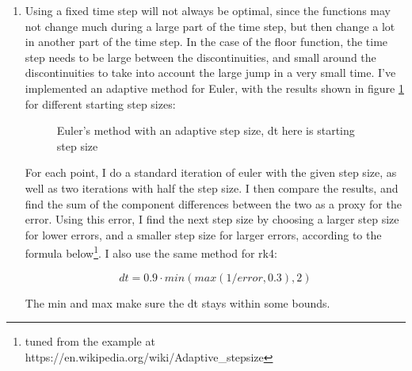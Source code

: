 \documentclass[12pt,a4paper]{article}
\begin{document}
\begin{enumerate}[label=(\alph*)]
	\item Using a fixed time step will not always be optimal, since the functions may not change much during a large part of the time step, but then change a lot in another part of the time step. In the case of the floor function, the time step needs to be large between the discontinuities, and small around the discontinuities to take into account the large jump in a very small time. I've implemented an adaptive method for Euler, with the results shown in figure \ref{fig:bonus} for different starting step sizes:
	\begin{figure}[h!]
		\centering
		\qquad
		\caption{Euler's method with an adaptive step size, dt here is starting step size}		
		\label{fig:bonus}%
		\end{figure}

	For each point, I do a standard iteration of euler with the given step size, as well as two iterations with half the step size. I then compare the results, and find the sum of the component differences between the two as a proxy for the error. Using this error, I find the next step size by choosing a larger step size for lower errors, and a smaller step size for larger errors, according to the formula below\footnote{tuned from the example at https://en.wikipedia.org/wiki/Adaptive\_stepsize}. I also use the same method for rk4:

	$$dt=0.9 \cdot min(max(1/error,0.3),2)$$

	The min and max make sure the dt stays within some bounds.

\end{enumerate}
\end{document}
